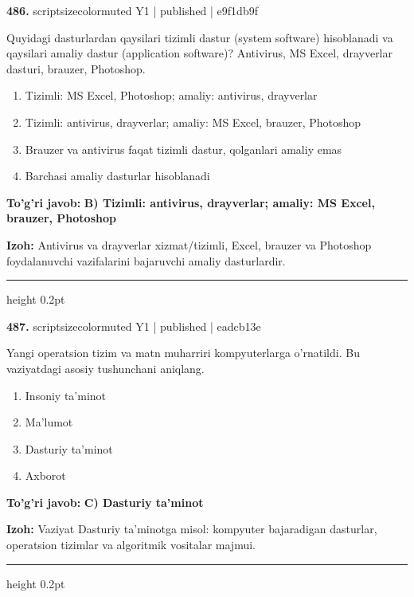 \documentclass[10pt,a4paper]{article}
\begin{document}
{\bfseries\sffamily\color{ink} 486.} {scriptsizecolor{muted} Y1 | published | e9f1db9f}
\par
Quyidagi dasturlardan qaysilari tizimli dastur (system software) hisoblanadi va qaysilari amaliy dastur (application software)? Antivirus, MS Excel, drayverlar dasturi, brauzer, Photoshop.
\begin{enumerate}[label=\Alph*),leftmargin=9mm]
\item Tizimli: MS Excel, Photoshop; amaliy: antivirus, drayverlar
\item Tizimli: antivirus, drayverlar; amaliy: MS Excel, brauzer, Photoshop
\item Brauzer va antivirus faqat tizimli dastur, qolganlari amaliy emas
\item Barchasi amaliy dasturlar hisoblanadi
\end{enumerate}
\begin{tcolorbox}[enhanced,breakable,colback=teal!4,colframe=teal!60!black,boxrule=0.45pt,arc=1.2mm,left=2.7mm,right=2.7mm,top=1.8mm,bottom=1.8mm,before skip=2mm,after skip=2mm]
{\bfseries\sffamily\color{teal}To'g'ri javob:} \textbf{B) Tizimli: antivirus, drayverlar; amaliy: MS Excel, brauzer, Photoshop}
\par\smallskip
{\bfseries Izoh:} Antivirus va drayverlar xizmat/tizimli, Excel, brauzer va Photoshop foydalanuvchi vazifalarini bajaruvchi amaliy dasturlardir.
\end{tcolorbox}
\vspace{2mm}\hrule height 0.2pt\vspace{3mm}

{\bfseries\sffamily\color{ink} 487.} {scriptsizecolor{muted} Y1 | published | eadcb13e}
\par
Yangi operatsion tizim va matn muharriri kompyuterlarga o'rnatildi. Bu vaziyatdagi asosiy tushunchani aniqlang.
\begin{enumerate}[label=\Alph*),leftmargin=9mm]
\item Insoniy ta'minot
\item Ma'lumot
\item Dasturiy ta'minot
\item Axborot
\end{enumerate}
\begin{tcolorbox}[enhanced,breakable,colback=teal!4,colframe=teal!60!black,boxrule=0.45pt,arc=1.2mm,left=2.7mm,right=2.7mm,top=1.8mm,bottom=1.8mm,before skip=2mm,after skip=2mm]
{\bfseries\sffamily\color{teal}To'g'ri javob:} \textbf{C) Dasturiy ta'minot}
\par\smallskip
{\bfseries Izoh:} Vaziyat Dasturiy ta'minotga misol: kompyuter bajaradigan dasturlar, operatsion tizimlar va algoritmik vositalar majmui.
\end{tcolorbox}
\vspace{2mm}\hrule height 0.2pt\vspace{3mm}
\end{document}
